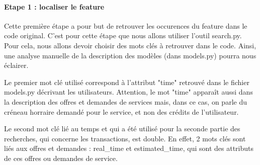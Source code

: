 \paragraph{Etape 1 : localiser le feature}

Cette première étape a pour but de retrouver les occurences du feature dans le code original.  C'est pour cette étape que nous allons utiliser l'outil search.py.  Pour cela,  nous allons devoir choisir des mots clés à retrouver dans le code.  Ainsi,  une analyse manuelle de la description des modèles (dans models.py) pourra nous éclairer.  

Le premier mot clé utilisé correspond à l'attribut "time" retrouvé dans le fichier models.py décrivant les utilisateurs.  Attention,  le mot "time" apparaît aussi dans la description des offres et demandes de services mais,  dans ce cas,  on parle du créneau horraire demandé pour le service,  et non des crédits de l'utilisateur.  

Le second mot clé lié au temps et qui a été utilisé pour la seconde partie des recherches,  qui concerne les transactions,  est double.  En effet,  2 mots clés sont liés aux offres et demandes : real\_time et estimated\_time,  qui sont des attributs de ces offres ou demandes de service.


